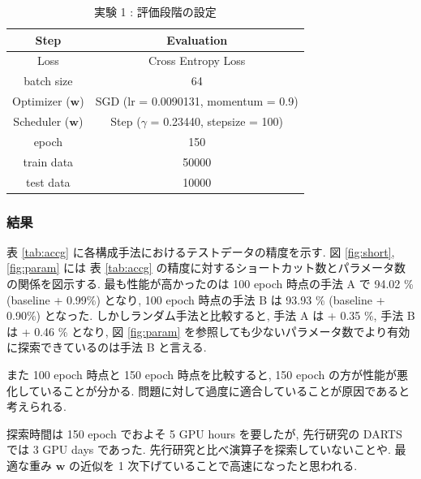 \begin{table}[tb]
  \begin{center}
    \caption{実験 1 : 評価段階の設定}
  	\vspace{3mm}
    \begin{tabular}{|c|c|} \hline
      Step & Evaluation \\ \hline\hline
      Loss & Cross Entropy Loss \\ \hline
      batch size & 64 \\ \hline
      Optimizer ($\bm{w}$) & SGD (lr = 0.0090131, momentum = 0.9) \\ \hline
      Scheduler ($\bm{w}$) & Step ($\gamma$ = 0.23440, stepsize = 100) \\ \hline
      epoch & 150\\ \hline
      train data & 50000\\ \hline
      test data &  10000\\ \hline
    \end{tabular}
    \label{tab:exp2/eval}
  \end{center}
\end{table}


\clearpage
\changeindent{0cm}
\subsubsection{結果}
\label{sec:exp.01_02}
\changeindent{2cm}



表 \ref{tab:accg} に各構成手法におけるテストデータの精度を示す.
図 \ref{fig:short}, \ref{fig:param} には
表 \ref{tab:accg} の精度に対するショートカット数とパラメータ数の関係を図示する.
最も性能が高かったのは 100 epoch 時点の手法 A で 94.02 \% (baseline + 0.99\%) となり,
100 epoch 時点の手法 B は 93.93 \% (baseline + 0.90\%) となった.
しかしランダム手法と比較すると, 手法 A は + 0.35 \%, 手法 B は + 0.46 \% となり,
図 \ref{fig:param} を参照しても少ないパラメータ数でより有効に探索できているのは手法 B と言える.

また 100 epoch 時点と 150 epoch 時点を比較すると, 150 epoch の方が性能が悪化していることが分かる.
問題に対して過度に適合していることが原因であると考えられる.

探索時間は 150 epoch でおよそ 5 GPU hours を要したが,
先行研究の DARTS では 3 GPU days であった.
先行研究と比べ演算子を探索していないことや.
最適な重み $\bm{w}$ の近似を 1 次下げていることで高速になったと思われる.



